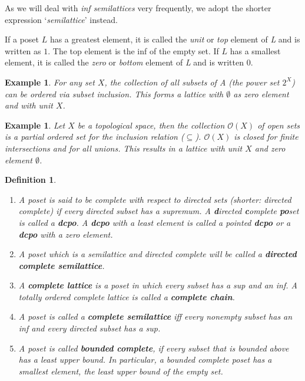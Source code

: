 \documentclass[a4paper,12pt]{article}
\newtheorem{example}[theorem]{Example}
\newtheorem{definition}[theorem]{Definition}
\begin{document}
As we will deal with \emph{inf semilattices} very frequently, we adopt the shorter expression `\emph{semilattice}' instead.

If a poset $L$ has a greatest element, it is called the \emph{unit} or \emph{top} element of \emph{L} and is written as $1$. The top element is the inf of the empty set. If $L$ has a smallest element, it is called the \emph{zero} or \emph{bottom} element of \emph{L} and is written 0.

\begin{example}
For any set $X$, the collection of all subsets of A (the power set $2^X$) can be ordered via subset inclusion. This forms a lattice with $\emptyset$ as zero element and with unit $X$.
\end{example}
\begin{example}
Let $X$ be a topological space, then the collection $\mathcal{O}(X)$ of open sets is a partial ordered set for the inclusion relation ($\subseteq$). $\mathcal{O}(X)$ is closed for finite intersections and for all unions. This results in a lattice with unit $X$ and zero element $\emptyset$.
\end{example}

\begin{definition}
\begin{enumerate}
  \item A poset is said to be \emph{complete with respect to directed sets} (shorter: directed complete) if every directed subset has a supremum. A \textbf{d}irected \textbf{c}omplete \textbf{po}set is called a \textbf{dcpo}. A \textbf{dcpo} with a least element is called a \emph{pointed} \textbf{dcpo} or a \textbf{dcpo} with a \emph{zero} element.
  \item A poset which is a semilattice and directed complete will be called a \textbf{directed complete semilattice}.
  \item A \textbf{complete lattice} is a poset in which \emph{every} subset has a sup and an inf. A \emph{totally ordered complete lattice} is called a \textbf{complete chain}.
  \item A poset is called a \textbf{complete semilattice}  iff every nonempty subset has an inf and every directed subset has a sup.
  \item A poset is called \textbf{bounded complete}, if every subset that is bounded above has a least upper bound. In particular, a bounded complete poset has a smallest element, the least upper bound of the empty set.
\end{enumerate}
\end{definition}
\end{document}
